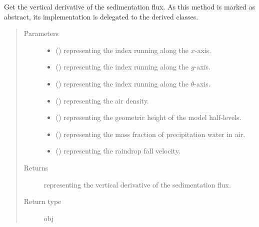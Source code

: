 \documentclass[letterpaper,10pt,english]{sphinxmanual}
\begin{document}
\begin{fulllineitems}
\begin{fulllineitems}
\label{\detokenize{api:tasmania.dycore.flux_sedimentation.FluxSedimentation.get_vertical_derivative_of_sedimentation_flux}}
Get the vertical derivative of the sedimentation flux.
As this method is marked as abstract, its implementation is delegated to the derived classes.
\begin{quote}\begin{description}
\item[{Parameters}] \leavevmode\begin{itemize}
\item {} 
 () \textendash{}  representing the index running along the \(x\)-axis.

\item {} 
 () \textendash{}  representing the index running along the \(y\)-axis.

\item {} 
 () \textendash{}  representing the index running along the \(\theta\)-axis.

\item {} 
 () \textendash{}  representing the air density.

\item {} 
 () \textendash{}  representing the geometric height of the model half-levels.

\item {} 
 () \textendash{}  representing the mass fraction of precipitation water in air.

\item {} 
 () \textendash{}  representing the raindrop fall velocity.

\end{itemize}

\item[{Returns}] \leavevmode
{} representing the vertical derivative of the sedimentation flux.

\item[{Return type}] \leavevmode
obj

\end{description}\end{quote}

\end{fulllineitems}


\end{fulllineitems}
\end{document}
